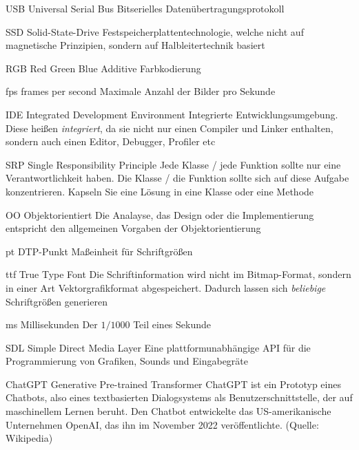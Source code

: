   {USB}            %
  {Universal Serial Bus}  %
  {Bitserielles Datenübertragungsprotokoll} %

  {SSD}            %
  {Solid-State-Drive}  %
  {Festspeicherplattentechnologie, welche nicht auf magnetische Prinzipien, sondern auf Halbleitertechnik basiert} %

  {RGB}            %
  {Red Green Blue}  %
  {Additive Farbkodierung} %

  {fps}            %
  {frames per second}  %
  {Maximale Anzahl der Bilder pro Sekunde} %

  {IDE}            %
  {Integrated Development Environment}  %
  {Integrierte Entwicklungsumgebung. Diese heißen \emph{integriert}, da sie nicht nur einen Compiler und Linker enthalten, sondern auch einen Editor, Debugger, Profiler etc} %

  {SRP}            %
  {Single Responsibility Principle}  %
  {Jede Klasse / jede Funktion sollte nur eine Verantwortlichkeit haben. Die Klasse / die Funktion sollte sich
  auf diese Aufgabe konzentrieren. Kapseln Sie eine Lösung in eine Klasse oder eine Methode} %

  {OO}            %
  {Objektorientiert}  %
  {Die Analayse, das Design oder die Implementierung entspricht den allgemeinen Vorgaben der Objektorientierung} %

  {pt}            %
  {DTP-Punkt}  %
  {Maßeinheit für Schriftgrößen} %

  {ttf}            %
  {True Type Font}  %
  {Die Schriftinformation wird nicht im Bitmap-Format, sondern in einer Art Vektorgrafikformat abgespeichert. Dadurch lassen sich \emph{beliebige} Schriftgrößen generieren} %

  {ms}            %
  {Millisekunden}  %
  {Der $1/1000$ Teil eines Sekunde} %

{SDL}            %
{Simple Direct Media Layer}  %
{Eine plattformunabhängige API für die Programmierung von Grafiken, Sounds und Eingabegräte} %

	{ChatGPT}
    {Generative Pre-trained Transformer}  %
	{ChatGPT ist ein Prototyp eines Chatbots, also eines textbasierten Dialogsystems als Benutzerschnittstelle, der auf maschinellem Lernen beruht. Den Chatbot entwickelte das US-amerikanische Unternehmen OpenAI, das ihn im November 2022 veröffentlichte. (Quelle: Wikipedia)}




